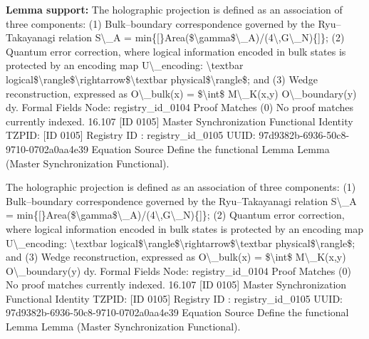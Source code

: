 \textbf{Lemma support:} The holographic projection is defined as an association of three components: (1) Bulk--boundary correspondence governed by the Ryu--Takayanagi relation S\textbackslash{}\_A = min\{[\}Area(\$\textbackslash{}gamma\$\textbackslash{}\_A)/(4\textbackslash{},G\textbackslash{}\_N)\{]\}; (2) Quantum error correction, where logical information encoded in bulk states is protected by an encoding map U\textbackslash{}\_encoding: \textbackslash{}textbar logical\$\textbackslash{}rangle\$\textbackslash{}rightarrow\$\textbackslash{}textbar physical\$\textbackslash{}rangle\$; and (3) Wedge reconstruction, expressed as O\textbackslash{}\_bulk(x) = \$\textbackslash{}int\$ M\textbackslash{}\_K(x,y) O\textbackslash{}\_boundary(y) dy. Formal Fields Node: registry\_id\_0104 Proof Matches (0) No proof matches currently indexed. 16.107 [ID 0105] Master Synchronization Functional Identity TZPID: [ID 0105] Registry ID : registry\_id\_0105 UUID: 97d9382b-6936-50c8-9710-0702a0aa4e39 Equation Source Define the functional Lemma Lemma (Master Synchronization Functional).\par
\endgroup

The holographic projection is defined as an association of three components: (1) Bulk--boundary correspondence governed by the Ryu--Takayanagi relation S\textbackslash{}\_A = min\{[\}Area(\$\textbackslash{}gamma\$\textbackslash{}\_A)/(4\textbackslash{},G\textbackslash{}\_N)\{]\}; (2) Quantum error correction, where logical information encoded in bulk states is protected by an encoding map U\textbackslash{}\_encoding: \textbackslash{}textbar logical\$\textbackslash{}rangle\$\textbackslash{}rightarrow\$\textbackslash{}textbar physical\$\textbackslash{}rangle\$; and (3) Wedge reconstruction, expressed as O\textbackslash{}\_bulk(x) = \$\textbackslash{}int\$ M\textbackslash{}\_K(x,y) O\textbackslash{}\_boundary(y) dy. Formal Fields Node: registry\_id\_0104 Proof Matches (0) No proof matches currently indexed. 16.107 [ID 0105] Master Synchronization Functional Identity TZPID: [ID 0105] Registry ID : registry\_id\_0105 UUID: 97d9382b-6936-50c8-9710-0702a0aa4e39 Equation Source Define the functional Lemma Lemma (Master Synchronization Functional).

